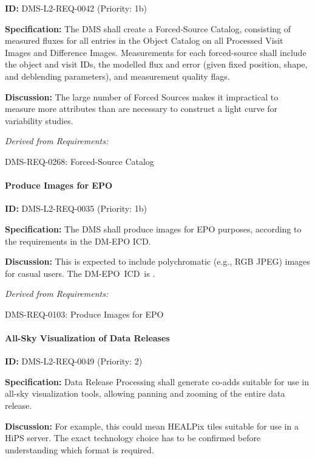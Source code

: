 \documentclass[SE,toc,lsstdraft]{lsstdoc}
\begin{document}
\label{DMS-L2-REQ-0042}
\textbf{ID:} DMS-L2-REQ-0042 (Priority: 1b)

\textbf{Specification:} The DMS shall create a Forced-Source Catalog, consisting of measured fluxes for all entries in the Object Catalog on all Processed Visit Images and Difference Images. Measurements for each forced-source shall include the object and visit IDs, the modelled flux and error (given fixed position, shape, and deblending parameters), and measurement quality flags.

\textbf{Discussion: }The large number of Forced Sources makes it impractical to measure more attributes than are necessary to construct a light curve for variability studies.

\emph{Derived from Requirements:}

DMS-REQ-0268:
Forced-Source Catalog \newline

\paragraph{Produce Images for EPO}\hfill  %

\label{DMS-L2-REQ-0035}
\textbf{ID:} DMS-L2-REQ-0035 (Priority: 1b)

\textbf{Specification:} The DMS shall produce images for EPO purposes, according to the requirements in the DM-EPO ICD.

    \textbf{Discussion: }This is expected to include polychromatic (e.g., RGB JPEG) images for casual users. The DM-EPO ICD is .

\emph{Derived from Requirements:}

DMS-REQ-0103:
Produce Images for EPO \newline

\paragraph{All-Sky Visualization of Data Releases}\hfill  %

\label{DMS-L2-REQ-0049}
\textbf{ID:} DMS-L2-REQ-0049 (Priority: 2)

\textbf{Specification:} Data Release Processing shall generate co-adds suitable for use in all-sky visualization tools, allowing panning and zooming of the entire data release.

\textbf{Discussion:} For example, this could mean HEALPix tiles suitable for use in a HiPS server. The exact technology choice has to be confirmed before understanding which format is required.
\end{document}
